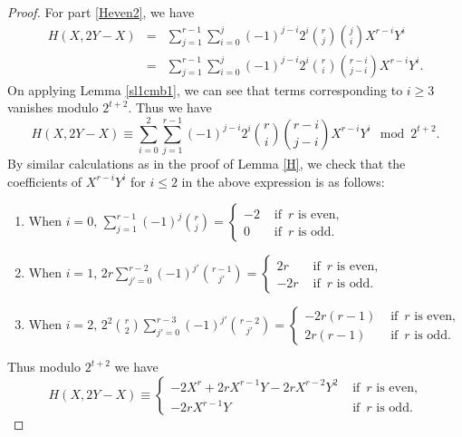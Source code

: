 \documentclass[11pt, reqno]{amsart}
\numberwithin{equation}{section}
\theoremstyle{definition}
\theoremstyle{remark}
\theoremstyle{definition}
\theoremstyle{remark}
\theoremstyle{remark}
\begin{document}
\begin{proof}
For part \eqref{Heven2}, we have
\begin{eqnarray*}
    H(X,2Y-X) &=& \sum_{j=1}^{r-1}\sum_{i=0}^{j}(-1)^{j-i}2^ i{r \choose j}{j \choose  i}X^{r- i}Y^{ i}\\
              &=& \sum_{j=1}^{r-1}\sum_{ i=0}^{j}(-1)^{j- i}2^ i{r \choose  i}{r- i \choose j- i}X^{r- i}Y^{ i}.
\end{eqnarray*}
On applying Lemma \ref{sl1cmb1}, we can see that terms corresponding to $ i\geq 3$ vanishes modulo $2^{t+2}$. Thus we have
\begin{equation}
H(X,2Y-X) \equiv \sum_{ i=0}^{2}\sum_{j=1}^{r-1}(-1)^{j- i}2^ i{r \choose  i}{r- i \choose j- i}X^{r-i}Y^{i} \mod 2^{t+2}.
\end{equation}
By similar calculations as in the proof of Lemma \ref{H}, we check that the coefficients of $X^{r-i}Y^{i}$ for $i\leq 2$ in the above expression is as follows:
\begin{enumerate}
   \item When $i=0,\,\displaystyle\sum_{j=1}^{r-1}(-1)^{j}{r \choose j} = \begin{cases}
   -2 &\text{ if }\, r \text{ is even, }\\
   0 &\text{ if }\, r \text{ is odd.}
   \end{cases}
   $
   \item When $i=1,\, 2r\displaystyle\sum_{j'=0}^{r-2}(-1)^{j'}{r-1 \choose j'}= \begin{cases}
   2r & \text{ if }\, r \text{ is even,}\\
   -2r & \text{ if }\, r \text{ is odd.}
   \end{cases}$
   \item When $i=2,\, 2^2{r \choose 2}\displaystyle\sum_{j'=0}^{r-3}(-1)^{j'}{r-2 \choose j'}= \begin{cases}
   -2r(r-1) & \text{ if }\, r \text{ is even,}\\
    2r(r-1) &\text{ if }\, r \text{ is odd.}
   \end{cases}$
\end{enumerate}
Thus modulo $2^{t+2}$ we have 
\begin{equation*}
    H(X,2Y-X) \equiv \begin{cases}
-2X^{r}+2rX^{r-1}Y-2rX^{r-2}Y^2 & \text{ if }\, r \text{ is even,}\\
 -2rX^{r-1}Y & \text{ if }\, r \text{ is odd.}
    \end{cases}   
\end{equation*}


\end{proof}
\end{document}
